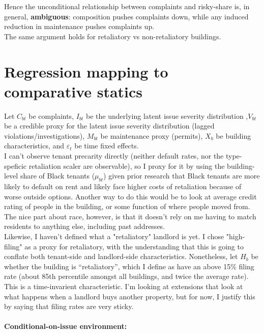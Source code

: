 \documentclass[11pt]{article}
\begin{document}
Hence the unconditional relationship between complaints and risky-share is, in general, \textbf{ambiguous}: composition pushes complaints down, while any induced reduction in maintenance pushes complaints up.
\\

The same argument holds for retaliatory vs non-retaliatory buildings.
\clearpage
\section{Regression mapping to comparative statics}

Let $C_{bt}$ be complaints, $I_{bt}$ be the underlying latent issue severity distribution ,$V_{bt}$ be a credible proxy for the latent issue severity distribution (lagged violations/investigations), $M_{bt}$ be maintenance proxy (permits), $X_{b}$ be building characteristics, and $\varepsilon_t$ be time fixed effects. \\

I can't observe tenant precarity directly (neither default rates, nor the type-speficic retaliation scaler are observable), so I proxy for it by using the building-level share of Black tenants ($\mu_{bt}$) given prior research that Black tenants are more likely to default on rent and likely face higher costs of retaliation because of worse outside options. Another way to do this would be to look at average credit rating of people in the building, or some function of where people moved from. The nice part about race, however, is that it doesn't rely on me having to match residents to anything else, including past addresses. \\ 

Likewise, I haven't defined what a "retaliatory" landlord is yet. I chose "high-filing" as a proxy for retaliatory, with the understanding that this is going to conflate both tenant-side and landlord-side characteristics. Nonetheless, let $H_b$ be whether the building is ``retaliatory'', which I define as have an above 15\% filing rate (about 85th percentile amongst all buildings, and twice the average rate). This is a time-invarient characteristic. I'm looking at extensions that look at what happens when a landlord buys another property, but for now, I justify this by saying that filing rates are very sticky.

\clearpage
\paragraph{Conditional-on-issue environment:}
\end{document}
